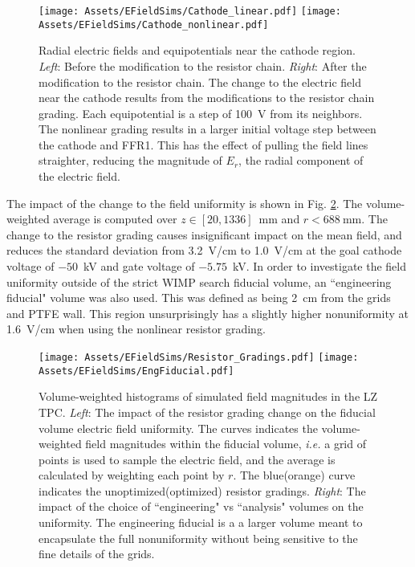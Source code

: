 \begin{figure}
    \centering
    \texttt{[image: Assets/EFieldSims/Cathode\_linear.pdf]}
       \texttt{[image: Assets/EFieldSims/Cathode\_nonlinear.pdf]}

    \caption[ Radial electric fields and equipotentials near the cathode region.]%
    {
    Radial electric fields and equipotentials near the cathode region.
    \textit{Left}: Before the modification to the resistor chain.
    \textit{Right}: After the modification to the resistor chain.
    The change to the electric field near the cathode results from the modifications to the resistor chain grading.
    Each equipotential is a step of 100~V from its neighbors.
    The nonlinear grading results in a larger initial voltage step between the cathode and FFR1. 
    This has the effect of pulling the field lines straighter, reducing the magnitude of $E_r$, the radial component of the electric field.}
    \label{fig:cathode_resistor_optimization}
\end{figure}

The impact of the change to the field uniformity is shown in Fig. \ref{fig:gradings_uniformity}. 
The volume-weighted average is computed over $z\in[20, 1336]$~mm and $r<688\mathrm{~mm}$.
The change to the resistor grading causes insignificant impact on the mean field, and reduces the standard deviation from 3.2~V/cm to 1.0~V/cm at the goal cathode voltage of $-50$~kV and gate voltage of $-5.75$~kV.
In order to investigate the field uniformity outside of the strict WIMP search fiducial volume, an ``engineering fiducial" volume was also used.
This was defined as being 2~cm from the grids and PTFE wall.
This region unsurprisingly has a slightly higher nonuniformity at 1.6~V/cm when using the nonlinear resistor grading.

\begin{figure}
    \centering
    \texttt{[image: Assets/EFieldSims/Resistor\_Gradings.pdf]}
    \texttt{[image: Assets/EFieldSims/EngFiducial.pdf]}
    \caption[Volume-weighted histograms of simulated field magnitudes in the LZ TPC.]%
    {
    Volume-weighted histograms of simulated field magnitudes in the LZ TPC.
    \textit{Left}: The impact of the resistor grading change on the fiducial volume electric field uniformity.
    The curves indicates the volume-weighted field magnitudes within the fiducial volume, \textit{i.e.} a grid of points is used to sample the electric field, and the average is calculated by weighting each point by $r$.
    The blue(orange) curve indicates the unoptimized(optimized) resistor gradings.
    \textit{Right}: The impact of the choice of ``engineering" vs ``analysis" volumes on the uniformity. 
    The engineering fiducial is a a larger volume meant to encapsulate the full nonuniformity without being sensitive to the fine details of the grids.
    }
    \label{fig:gradings_uniformity}
\end{figure}

